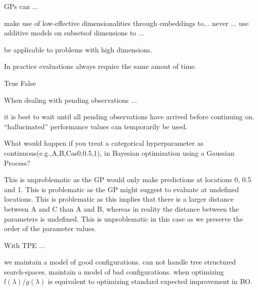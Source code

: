 \documentclass{exam}
\begin{document}
\begin{questions}
		\question GPs can ...
		\begin{choices}
			\choice make use of low-effective dimensionalities through embeddings to... %
			\choice never ...
			\choice use additive models on subsetsof dimensions to ... %
		\end{choices}
		be applicable to problems with high dimensions.
		
		\question In practice evaluations always require the same amout of time.
		\begin{choices}
			\choice True
			\choice False
		\end{choices}
		
		\question When dealing with pending observations ...
		\begin{choices}
			\choice it is best to wait until all pending observations have arrived before continuing on.
			\choice ``hallucinated'' performance values can temporarily be used. %
		\end{choices}
		
		\question What would happen if you treat a categorical hyperparameter as continuous(e.g.,{A,B,C}as{0,0.5,1}), in Bayesian optimization using a Gaussian Process?
		\begin{choices}
			\choice This is unproblematic as the GP would only make predictions at locations 0, 0.5 and 1.
			\choice This is problematic as the GP might suggest to evaluate at undefined locations. %
			\choice This is problematic as this implies that there is a larger distance between A and C than A and B, whereas in reality the distance between the parameters is undefined. %
			\choice This is unproblematic in this case as we preserve the order of the parameter values.
		\end{choices}
		
		\question With TPE ...
		\begin{choices}
			\choice we maintain a model of good configurations. %
			\choice can not handle tree structured search-spaces.
			\choice maintain a model of bad configurations. %
			\choice when optimizing $l(\lambda)/g(\lambda)$ is equivalent to optimizing standard expected improvement in BO. %
		\end{choices}
		
	\end{questions}
\end{document}
